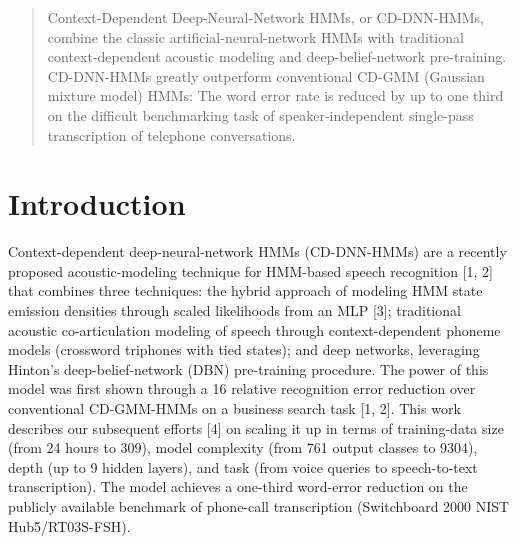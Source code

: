 \documentclass{article}
\begin{document}


\begin{abstract}
Context-Dependent Deep-Neural-Network HMMs, or CD-DNN-HMMs, combine the
classic artificial-neural-network HMMs with traditional context-dependent acoustic modeling and deep-belief-network pre-training.
CD-DNN-HMMs greatly outperform conventional CD-GMM (Gaussian mixture model)
HMMs: The word error rate is reduced by up
to one third on the difficult benchmarking
task of speaker-independent single-pass
transcription of telephone conversations.
\end{abstract}

\section{Introduction }
\label{submission}
Context-dependent deep-neural-network HMMs (CD-DNN-HMMs) are a recently proposed acoustic-modeling technique for HMM-based speech recognition [1, 2]
that combines three techniques: the hybrid approach
of modeling HMM state emission densities through
scaled likelihoods from an MLP [3]; traditional acoustic co-articulation modeling of speech through context-dependent phoneme models (crossword triphones with
tied states); and deep networks, leveraging Hinton’s
deep-belief-network (DBN) pre-training procedure.
The power of this model was first shown through a 16%
relative recognition error reduction over conventional
CD-GMM-HMMs on a business search task [1, 2]. This
work describes our subsequent efforts [4] on scaling it
up in terms of training-data size (from 24 hours to
309), model complexity (from 761 output classes to
9304), depth (up to 9 hidden layers), and task (from voice queries to speech-to-text transcription). The
model achieves a one-third word-error reduction on the
publicly available benchmark of phone-call transcription (Switchboard 2000 NIST Hub5/RT03S-FSH).
\end{document}
